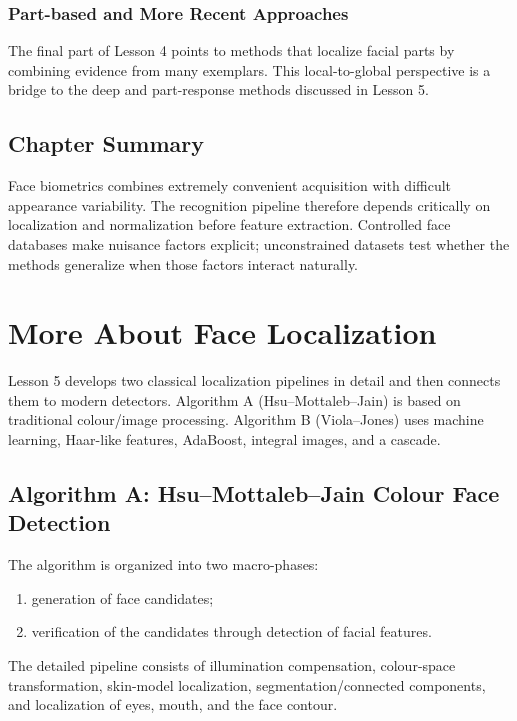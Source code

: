 \documentclass[11pt,a4paper,oneside]{report}
\begin{document}
\subsection{Part-based and More Recent Approaches}

The final part of Lesson 4 points to methods that localize facial parts by
combining evidence from many exemplars.  This local-to-global perspective is a
bridge to the deep and part-response methods discussed in Lesson 5.

\section{Chapter Summary}

Face biometrics combines extremely convenient acquisition with difficult
appearance variability.  The recognition pipeline therefore depends critically
on localization and normalization before feature extraction.  Controlled face
databases make nuisance factors explicit; unconstrained datasets test whether
the methods generalize when those factors interact naturally.

\chapter{More About Face Localization}
\label{chap:more-face-localization}

Lesson 5 develops two classical localization pipelines in detail and then
connects them to modern detectors.  Algorithm A (Hsu--Mottaleb--Jain) is based on
traditional colour/image processing.  Algorithm B (Viola--Jones) uses machine
learning, Haar-like features, AdaBoost, integral images, and a cascade.

\section{Algorithm A: Hsu--Mottaleb--Jain Colour Face Detection}
\label{sec:hsu-face-detection}

The algorithm is organized into two macro-phases:
\begin{enumerate}
    \item generation of face candidates;
    \item verification of the candidates through detection of facial features.
\end{enumerate}
The detailed pipeline consists of illumination compensation, colour-space
transformation, skin-model localization, segmentation/connected components, and
localization of eyes, mouth, and the face contour.
\end{document}
